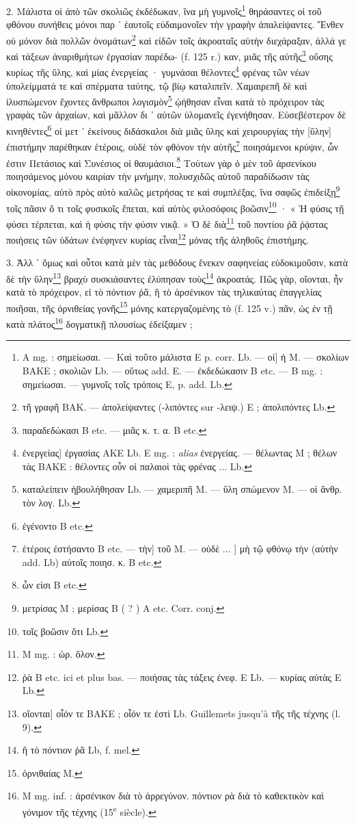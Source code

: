 \documentclass[a4paper, 11pt, oneside, polutonikogreek, french]{article}
\begin{document}
2. Μάλιστα οἱ ἀπὸ τῶν σκολιῶς ἐκδέδωκαν, ἵνα μὴ γυμνοῖς\footnote{A mg. : σημείωσαι. --- Kαὶ τοῦτο μάλιστα E p. corr. Lb. --- οἱ] ἡ M. --- σκολίων BAKE ; σκολιῶν Lb. --- οὕτως add. E. --- ἐκδεδώκασιν B etc. --- B mg. : σημείωσαι. --- γυμνοῖς τοῖς τρόποις E, p. add. Lb.} θηράσαντες οἱ τοῦ φθόνου συνήθεις μόνοι παρ ᾽ ἑαυτοῖς εὐδαιμονοῖεν τὴν γραφὴν ἀπαλείψαντες. Ἔνθεν οὐ μόνον διὰ πολλῶν ὀνομάτων\footnote{τῆ γραφῆ BAK. --- ἀπολείψαντες (-λιπόντες sur -λειψ.) E ; ἀπολιπόντες Lb.} καὶ εἰδῶν τοῖς ἀκροαταῖς αὐτὴν διεχάραξαν, ἀλλά γε καὶ τάξεων ἀναριθμήτων ἐργασίαν παρέδω- (f. 125 r.) καν, μιᾶς τῆς αὐτῆς\footnote{παραδεδώκασι B etc. --- μιᾶς κ. τ. α. B etc.} οὔσης κυρίως τῆς ὕλης, καὶ μίας ἐνεργείας · γυμνάσαι θέλοντες\footnote{ἐνεργείας] ἐργασίας AKE Lb. E mg. : \emph{alias} ἐνεργείας. --- θέλωντας M ; θέλων τὰς BAKE : θέλοντες οὖν οἱ παλαιοὶ τὰς φρένας ... Lb.} φρένας τῶν νέων ὑπολείμματά τε καὶ σπέρματα ταύτης, τῷ βίῳ καταλιπεῖν. Χαμαιρεπῆ δὲ καὶ ἰλυσπώμενον ἔχοντες ἄνθρωποι λογισμὸν\footnote{καταλείπειν ἠβουλήθησαν Lb. --- χαμεριπῆ M. --- ὕλη σπώμενον M. --- οἱ ἄνθρ. τὸν λογ. Lb.} ᾠήθησαν εἶναι κατὰ τὸ πρόχειρον τὰς γραφὰς τῶν ἀρχαίων, καὶ μᾶλλον δι ᾽ αὐτῶν ὑλομανεῖς ἐγενήθησαν. Εὐσεβέστερον δὲ κινηθέντες\footnote{ἐγένοντο B etc.} οἱ μετ ᾽ ἐκείνους διδάσκαλοι διὰ μιᾶς ὕλης καὶ χειρουργίας τὴν [ὕλην] ἐπιστήμην παρέθηκαν ἑτέροις, οὐδὲ τὸν φθόνον τὴν αὐτῆς\footnote{ἑτέροις ἐστήσαντο B etc. --- τὴν] τοῦ M. --- οὐδὲ ... ] μὴ τῷ φθόνῳ τὴν (αὐτὴν add. Lb) αὐτοῖς ποιησ. κ. B etc.} ποιησάμενοι κρύψιν, ὧν ἐστιν Πετάσιος καὶ Συνέσιος οἱ θαυμάσιοι.\footnote{ὧν εἰσι B etc.} Τούτων γὰρ ὁ μὲν τοῦ ἀρσενίκου ποιησάμενος μόνου καιρίαν τὴν μνήμην, πολυσχιδῶς αὐτοῦ παραδίδωσιν τὰς οἰκονομίας, αὐτὸ πρὸς αὐτὸ καλῶς μετρήσας τε καὶ συμπλέξας, ἵνα σαφῶς ἐπιδείξῃ\footnote{μετρίσας M ; μερίσας B ( ? ) A etc. Corr. conj.} τοῖς πᾶσιν ὅ τι τοῖς φυσικοῖς ἕπεται, καὶ αὐτὸς φιλοσόφοις βοῶσιν\footnote{τοῖς βοῶσιν ὅτι Lb.} · « Ἡ φύσις τῇ φύσει τέρπεται, καὶ ἡ φύσις τὴν φύσιν νικᾷ. » Ὁ δὲ διὰ\footnote{M mg. : ὡρ. ὅλον.} τοῦ ποντίου ῥᾶ ῥᾴστας ποιήσεις τῶν ὑδάτων ἐνέφηνεν κυρίας εἶναι\footnote{ῥὰ B etc. ici et plus bas. --- ποιήσας τὰς τάξεις ἐνεφ. E Lb. --- κυρίας αὐτὰς E Lb.} μόνας τῆς ἀληθοῦς ἐπιστήμης.

3. Ἀλλ ᾽ ὅμως καὶ οὗτοι κατὰ μὲν τὰς μεθόδους ἕνεκεν σαφηνείας εὐδοκιμοῦσιν, κατὰ δὲ τὴν ὕλην\footnote{οἴονται] οἷόν τε BAKE ; οἷόν τε ἐστὶ Lb. Guillemets jusqu'à τῆς τῆς τέχνης (l. 9).} βραχὺ συσκιάσαντες ἐλύπησαν τοὺς\footnote{ἢ τὸ πόντιον ῥᾶ Lb, f. mel.} ἀκροατάς. Πῶς γὰρ, οἴονται, ἦν κατὰ τὸ πρόχειρον, εἰ τὸ πόντιον ῥᾶ, ἢ τὸ ἀρσένικον τὰς τηλικαύτας ἐπαγγελίας ποιῆσαι, τῆς ὀρνιθείας γονῆς\footnote{ὀρνιθαίας M.} μόνης κατεργαζομένης τὸ (f. 125 v.) πᾶν, ὡς ἐν τῇ κατὰ πλάτος\footnote{M mg. inf. : ἀρσένικον διὰ τὸ ἀρρεγύνον. πόντιον ρὰ διὰ τὸ καθεκτικὸν καὶ γόνιμον τῆς τέχνης (15\textsuperscript{e} siècle).} δογματικῇ πλουσίως ἐδείξαμεν ;
\end{document}
